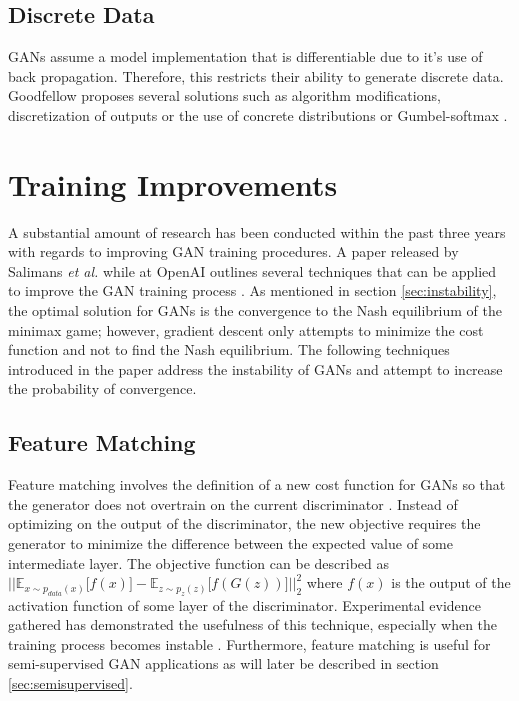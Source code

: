 \documentclass[11pt]{article}
\begin{document}
\subsection{Discrete Data}
GANs assume a model implementation that is differentiable due to it's use of back propagation. Therefore, this restricts their ability to generate discrete data. Goodfellow proposes several solutions such as algorithm modifications, discretization of outputs or the use of concrete distributions or Gumbel-softmax \citep{2017arXiv170100160G}.



\section{Training Improvements}
A substantial amount of research has been conducted within the past three years with regards to improving GAN training procedures. A paper released by Salimans \textit{et al.} while at OpenAI outlines several techniques that can be applied to improve the GAN training process \citep{2016arXiv160603498S}. As mentioned in section \ref{sec:instability}, the optimal solution for GANs is the convergence to the Nash equilibrium of the minimax game; however, gradient descent only attempts to minimize the cost function and not to find the Nash equilibrium. The following techniques introduced in the paper address the instability of GANs and attempt to increase the probability of convergence.

\subsection{Feature Matching}
Feature matching involves the definition of a new cost function for GANs so that the generator does not overtrain on the current discriminator \citep{2016arXiv160603498S}. Instead of optimizing on the output of the discriminator, the new objective requires the generator to minimize the difference between the expected value of some intermediate layer. The objective function can be described as $\Big|\Big|\mathbb{E}_{x\sim p_{data}(x)}\Big[f(x)\Big] - \mathbb{E}_{z\sim p_{z}(z)}\Big[f(G(z))\Big]\Big|\Big|_2^2$ where $f(x)$ is the output of the activation function of some layer of the discriminator. Experimental evidence gathered has demonstrated the usefulness of this technique, especially when the training process becomes instable \citep{2016arXiv160603498S}. Furthermore, feature matching is useful for semi-supervised GAN applications as will later be described in section \ref{sec:semisupervised}.
\end{document}
